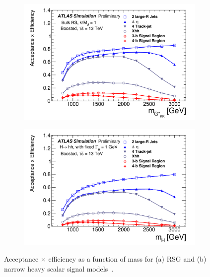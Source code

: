\begin{figure}[h!]
  \centering
  \captionsetup{justification=centering}

   \begin{subfigure}[t]{0.5\textwidth}
        \centering
        \includegraphics[width=\textwidth]{figures/4b_eff_RSG}
        \caption{}
    \end{subfigure}%
    \begin{subfigure}[t]{0.5\textwidth}
        \centering
        \includegraphics[width=\textwidth]{figures/4b_eff_H}
        \caption{}
    \end{subfigure}

   \caption{Acceptance $\times$ efficiency as a function of mass for (a) RSG and (b) narrow heavy scalar signal models~\cite{4bconf}.}
  \label{fig:4beff}
\end{figure}

